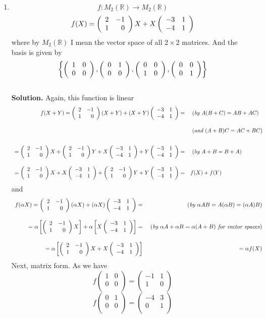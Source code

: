 \documentclass[12pt,fleqn]{article} %
\begin{document}
\begin{enumerate}
\item \[f:M_2(\mathbb{R})\to M_2(\mathbb{R})\]%
	\[f(X)=\left(\begin{array}{rr}2&-1\\1&0\end{array}\right)X+X\left(\begin{array}{rr}-3&1\\-4&1\end{array}\right)\]
	where by $M_2(\mathbb{R})$ I mean the vector space of all $2\times2$ matrices. And the basis is given by
	\[\left\{\left(\begin{array}{rr}1&0\\0&0\end{array}\right),\left(\begin{array}{rr}0&1\\0&0\end{array}\right),\left(\begin{array}{rr}0&0\\1&0\end{array}\right),\left(\begin{array}{rr}0&0\\0&1\end{array}\right)\right\}\]
	\\\textbf{Solution.}
	Again, this function is linear
	\[\begin{array}{rl}f(X+Y)
		=\left(\begin{array}{rr}2&-1\\1&0\end{array}\right)(X+Y)+(X+Y)\left(\begin{array}{rr}-3&1\\-4&1\end{array}\right)=&\mbox{ (\textit{by $A(B+C)=AB+AC$})}\\[2em]
		&\mbox{ (\textit{and $(A+B)C=AC+BC$})}\\[2em]
		=\left(\begin{array}{rr}2&-1\\1&0\end{array}\right)X+\left(\begin{array}{rr}2&-1\\1&0\end{array}\right)Y+X\left(\begin{array}{rr}-3&1\\-4&1\end{array}\right)+
		Y\left(\begin{array}{rr}-3&1\\-4&1\end{array}\right)=&\mbox{ (\textit{by $A+B=B+A$})}\\[2em]
		=\left(\begin{array}{rr}2&-1\\1&0\end{array}\right)X+X\left(\begin{array}{rr}-3&1\\-4&1\end{array}\right)+\left(\begin{array}{rr}2&-1\\1&0\end{array}\right)Y+
		Y\left(\begin{array}{rr}-3&1\\-4&1\end{array}\right)=&f(X)+f(Y)
	\end{array}\]
	and
	\[\begin{array}{rr}f(\alpha X)=
		\left(\begin{array}{rr}2&-1\\1&0\end{array}\right)(\alpha X)+(\alpha X)\left(\begin{array}{rr}-3&1\\-4&1\end{array}\right)=&\mbox{ (\textit{by $\alpha AB=A(\alpha B)
		=(\alpha A)B$})}\\[2em]
		=\alpha\left[\left(\begin{array}{rr}2&-1\\1&0\end{array}\right)X\right]+\alpha\left[X\left(\begin{array}{rr}-3&1\\-4&1\end{array}\right)\right]=&\mbox{ (\textit{by $\alpha A+
		\alpha B=\alpha(A+B)$ for vector spaces})}\\[2em]
		=\alpha\left[\left(\begin{array}{rr}2&-1\\1&0\end{array}\right)X+X\left(\begin{array}{rr}-3&1\\-4&1\end{array}\right)\right]&=\alpha f(X)
	\end{array}\]
	Next, matrix form. As we have
	\[f\left(\begin{array}{rr}
	1&0\\
	0&0\\
	\end{array}\right)
	=\left(\begin{array}{rr}
	-1&1\\
	1&0\\
	\end{array}\right)
	\]
	\[f\left(\begin{array}{rr}
	0&1\\
	0&0\\
	\end{array}\right)
	=\left(\begin{array}{rr}
	-4&3\\
	0&1\\
	\end{array}\right)
\]
\end{enumerate}
\end{document}
